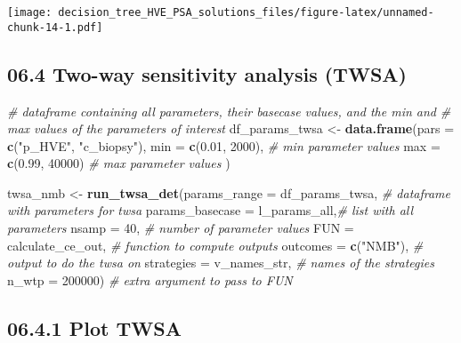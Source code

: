 \documentclass[
]{article}
\newenvironment{Shaded}{\begin{snugshade}}{\end{snugshade}}
\newcommand{\CommentTok}[1]{\textcolor[rgb]{0.56,0.35,0.01}{\textit{#1}}}
\newcommand{\DataTypeTok}[1]{\textcolor[rgb]{0.13,0.29,0.53}{#1}}
\newcommand{\DecValTok}[1]{\textcolor[rgb]{0.00,0.00,0.81}{#1}}
\newcommand{\FloatTok}[1]{\textcolor[rgb]{0.00,0.00,0.81}{#1}}
\newcommand{\KeywordTok}[1]{\textcolor[rgb]{0.13,0.29,0.53}{\textbf{#1}}}
\newcommand{\NormalTok}[1]{#1}
\newcommand{\StringTok}[1]{\textcolor[rgb]{0.31,0.60,0.02}{#1}}
\begin{document}
\texttt{[image: decision\_tree\_HVE\_PSA\_solutions\_files/figure-latex/unnamed-chunk-14-1.pdf]}

\hypertarget{two-way-sensitivity-analysis-twsa}{%
\subsection{06.4 Two-way sensitivity analysis
(TWSA)}\label{two-way-sensitivity-analysis-twsa}}

\begin{Shaded}
\begin{Highlighting}[]
\CommentTok{# dataframe containing all parameters, their basecase values, and the min and }
\CommentTok{# max values of the parameters of interest}
\NormalTok{df_params_twsa <-}\StringTok{ }\KeywordTok{data.frame}\NormalTok{(}\DataTypeTok{pars =} \KeywordTok{c}\NormalTok{(}\StringTok{"p_HVE"}\NormalTok{, }\StringTok{"c_biopsy"}\NormalTok{),}
                              \DataTypeTok{min  =} \KeywordTok{c}\NormalTok{(}\FloatTok{0.01}\NormalTok{, }\DecValTok{2000}\NormalTok{), }\CommentTok{# min parameter values}
                              \DataTypeTok{max  =} \KeywordTok{c}\NormalTok{(}\FloatTok{0.99}\NormalTok{, }\DecValTok{40000}\NormalTok{) }\CommentTok{# max parameter values}
\NormalTok{                              )}

\NormalTok{twsa_nmb <-}\StringTok{ }\KeywordTok{run_twsa_det}\NormalTok{(}\DataTypeTok{params_range =}\NormalTok{ df_params_twsa, }\CommentTok{# dataframe with parameters for twsa}
                         \DataTypeTok{params_basecase =}\NormalTok{ l_params_all,}\CommentTok{# list with all parameters}
                         \DataTypeTok{nsamp      =} \DecValTok{40}\NormalTok{,               }\CommentTok{# number of parameter values}
                         \DataTypeTok{FUN        =}\NormalTok{ calculate_ce_out, }\CommentTok{# function to compute outputs}
                         \DataTypeTok{outcomes   =} \KeywordTok{c}\NormalTok{(}\StringTok{"NMB"}\NormalTok{),         }\CommentTok{# output to do the twsa on}
                         \DataTypeTok{strategies =}\NormalTok{ v_names_str,      }\CommentTok{# names of the strategies}
                         \DataTypeTok{n_wtp      =} \DecValTok{200000}\NormalTok{)           }\CommentTok{# extra argument to pass to FUN}
\end{Highlighting}
\end{Shaded}

\hypertarget{plot-twsa}{%
\subsection{06.4.1 Plot TWSA}\label{plot-twsa}}
\end{document}
